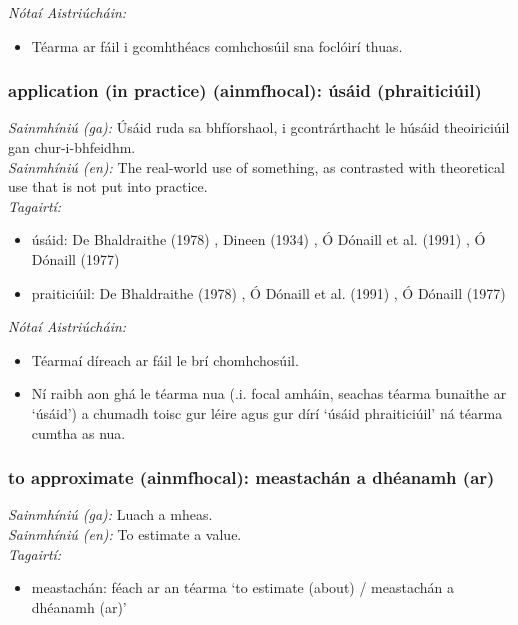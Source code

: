  \noindent \textit{Nótaí Aistriúcháin:}
\begin{itemize}
	\item Téarma ar fáil i gcomhthéacs comhchosúil sna foclóirí thuas.
\end{itemize}


\subsubsection*{application (in practice) (ainmfhocal): úsáid (phraiticiúil)}
 \noindent \textit{Sainmhíniú (ga):} Úsáid ruda sa bhfíorshaol, i gcontrárthacht le húsáid theoiriciúil gan chur-i-bhfeidhm.
\\
 \noindent \textit{Sainmhíniú (en):} The real-world use of something, as contrasted with theoretical use that is not put into practice.
\\
 \noindent \textit{Tagairtí:}
\begin{itemize}
	\item úsáid: De Bhaldraithe (1978) \cite{de-bhaldraithe}, Dineen (1934) \cite{dineen}, Ó Dónaill et al. (1991) \cite{focloir-beag}, Ó Dónaill (1977) \cite{odonaill}
	\item praiticiúil: De Bhaldraithe (1978) \cite{de-bhaldraithe}, Ó Dónaill et al. (1991) \cite{focloir-beag}, Ó Dónaill (1977) \cite{odonaill}
\end{itemize}

 \noindent \textit{Nótaí Aistriúcháin:}
\begin{itemize}
	\item Téarmaí díreach ar fáil le brí chomhchosúil.
	\item Ní raibh aon ghá le téarma nua (.i. focal amháin, seachas téarma bunaithe ar `úsáid') a chumadh toisc gur léire agus gur dírí `úsáid phraiticiúil' ná téarma cumtha as nua.
\end{itemize}


\subsubsection*{to approximate (ainmfhocal): meastachán a dhéanamh (ar)}
 \noindent \textit{Sainmhíniú (ga):} Luach a mheas.
\\
 \noindent \textit{Sainmhíniú (en):} To estimate a value.
\\
 \noindent \textit{Tagairtí:}
\begin{itemize}
	\item meastachán: féach ar an téarma `to estimate (about) / meastachán a dhéanamh (ar)'
\end{itemize}

